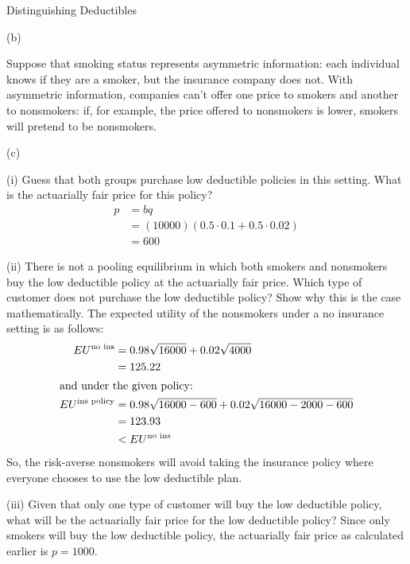 \documentclass[8pt]{extarticle}
\begin{document}
\begin{problem}{Distinguishing Deductibles}
\begin{problem}{(b)}
    \end{problem}
    Suppose that smoking status represents asymmetric information: each individual knows if they are a smoker, but the insurance company does not. With asymmetric information, companies can't offer one price to smokers and another to nonsmokers: if, for example, the price offered to nonsmokers is lower, smokers will pretend to be nonsmokers.
    \begin{problem}{(c)}
      \begin{problem}{(i)}
        Guess that both groups purchase low deductible policies in this setting. What is the actuarially fair price for this policy?
        \tcblower
        \begin{align*}
          p &= bq\\
            &= (10000)(0.5\cdot 0.1 + 0.5\cdot 0.02)\\
            &= 600
        \end{align*}
      \end{problem}
      \begin{problem}{(ii)}
        There is not a pooling equilibrium in which both smokers and nonsmokers buy the low deductible policy at the actuarially fair price. Which type of customer does not purchase the low deductible policy? Show why this is the case mathematically.
        \tcblower
        The expected utility of the nonsmokers under a no insurance setting is as follows:
        \begin{align*}
          EU^{\text{no ins}} &= 0.98\sqrt{16000} + 0.02\sqrt{4000}\\
                             &= 125.22\\
                             \shortintertext{and under the given policy:}
          EU^{\text{ins policy}} &= 0.98\sqrt{16000-600} + 0.02\sqrt{16000-2000-600}\\
                                 &= 123.93\\
                                 &< EU^{\text{no ins}}
        \end{align*}
        So, the risk-averse nonsmokers will avoid taking the insurance policy where everyone chooses to use the low deductible plan.
      \end{problem}
      \begin{problem}{(iii)}
        Given that only one type of customer will buy the low deductible policy, what will be the actuarially fair price for the low deductible policy?
        \tcblower
        Since only smokers will buy the low deductible policy, the actuarially fair price as calculated earlier is $p = 1000$.

\end{problem}
\end{problem}
\end{problem}
\end{document}
